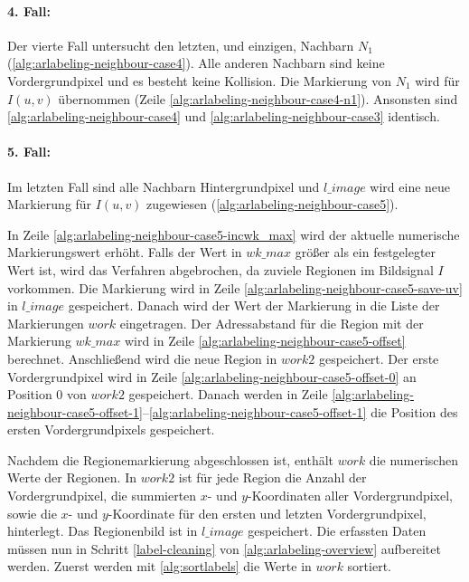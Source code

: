 
\paragraph{4. Fall:} %
\label{par:fall_4_}
Der vierte Fall untersucht den letzten, und einzigen, Nachbarn $N_1$ (\autoref{alg:arlabeling-neighbour-case4}). Alle
 anderen Nachbarn sind keine Vordergrundpixel und es besteht keine Kollision. Die Markierung von $N_1$ wird für
 $I(u,v)$ übernommen (Zeile \ref{alg:arlabeling-neighbour-case4-n1}). Ansonsten sind
 \autoref{alg:arlabeling-neighbour-case4} und \autoref{alg:arlabeling-neighbour-case3} identisch.




\paragraph{5. Fall:} %
\label{par:fall_5_}
Im letzten Fall sind alle Nachbarn Hintergrundpixel und $\mathit{l\_image}$ wird eine neue Markierung für $I(u,v)$
 zugewiesen (\autoref{alg:arlabeling-neighbour-case5}).



In Zeile \ref{alg:arlabeling-neighbour-case5-incwk_max} wird der aktuelle numerische Markierungswert erhöht. Falls der
 Wert in $\mathit{wk\_max}$ größer als ein festgelegter Wert ist, wird das Verfahren abgebrochen, da zuviele Regionen
 im Bildsignal $I$ vorkommen. Die Markierung wird in Zeile \ref{alg:arlabeling-neighbour-case5-save-uv} in
 $\mathit{l\_image}$ gespeichert. Danach wird der Wert der Markierung in die Liste der Markierungen $\mathit{work}$
 eingetragen. Der Adressabstand für die Region mit der Markierung $\mathit{wk\_max}$ wird in Zeile
 \ref{alg:arlabeling-neighbour-case5-offset} berechnet. Anschließend wird die neue Region in $\mathit{work2}$
 gespeichert. Der erste Vordergrundpixel wird in Zeile \ref{alg:arlabeling-neighbour-case5-offset-0} an Position $0$
 von $\mathit{work2}$ gespeichert. Danach werden in Zeile
 \ref{alg:arlabeling-neighbour-case5-offset-1}--\ref{alg:arlabeling-neighbour-case5-offset-1} die Position des ersten
 Vordergrundpixels gespeichert.


Nachdem die Regionemarkierung abgeschlossen ist, enthält $\mathit{work}$ die numerischen Werte der Regionen. In
 $\mathit{work2}$ ist für jede Region die Anzahl der Vordergrundpixel, die summierten $x$- und $y$-Koordinaten aller
 Vordergrundpixel, sowie die $x$- und $y$-Koordinate für den ersten und letzten Vordergrundpixel, hinterlegt. Das
 Regionenbild ist in $\mathit{l\_image}$ gespeichert. Die erfassten Daten müssen nun in Schritt \ref{label-cleaning} von
 \autoref{alg:arlabeling-overview} aufbereitet werden. Zuerst werden mit \autoref{alg:sortlabels} die Werte
 in $\mathit{work}$ sortiert.

